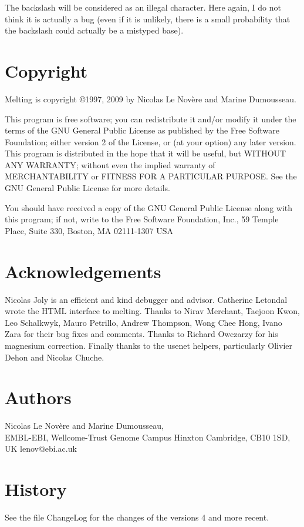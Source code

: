 \documentclass{article}
\begin{document}
The backslash will be considered 
 as an illegal character. Here again, I do not think it is actually a bug 
(even if it is unlikely, there is a small probability that the  backslash 
could actually be a mistyped base).   
   
\section{Copyright }
Melting is copyright 
\copyright 1997, 2009 by Nicolas Le Nov\`ere and Marine Dumousseau.  

This program is free software; 
you can redistribute it and/or modify it under the terms of the GNU General 
Public License as published by the Free Software Foundation; either version 
2 of the License, or (at your option) any later version.   
  This program 
is distributed in the hope that it will be useful, but WITHOUT ANY WARRANTY; 
without even the implied warranty of MERCHANTABILITY or FITNESS FOR A 
PARTICULAR PURPOSE.  See the GNU General Public License for more details. 
  
  You should have received a copy of the GNU General Public License 
along with this program; if not, write to the Free Software Foundation, 
Inc., 59 Temple Place, Suite 330, Boston, MA  02111-1307 USA   
   
\section{Acknowledgements}
Nicolas Joly is an efficient and kind debugger and advisor.  Catherine
Letondal wrote the HTML interface to melting. Thanks to Nirav Merchant,
Taejoon Kwon, Leo Schalkwyk, Mauro Petrillo, Andrew Thompson, Wong Chee Hong, Ivano
Zara for their bug fixes and comments. Thanks to Richard Owczarzy for his magnesium correction. Finally thanks to the usenet
helpers, particularly Olivier Dehon and Nicolas Chuche.

   
\section{Authors }
Nicolas Le Nov\`ere and Marine Dumousseau, \\
EMBL-EBI, 
Wellcome-Trust Genome Campus
Hinxton Cambridge, CB10 1SD, UK
lenov@ebi.ac.uk
  
\section{History }

See the file ChangeLog for the changes of the versions 4 and more recent.
\end{document}
